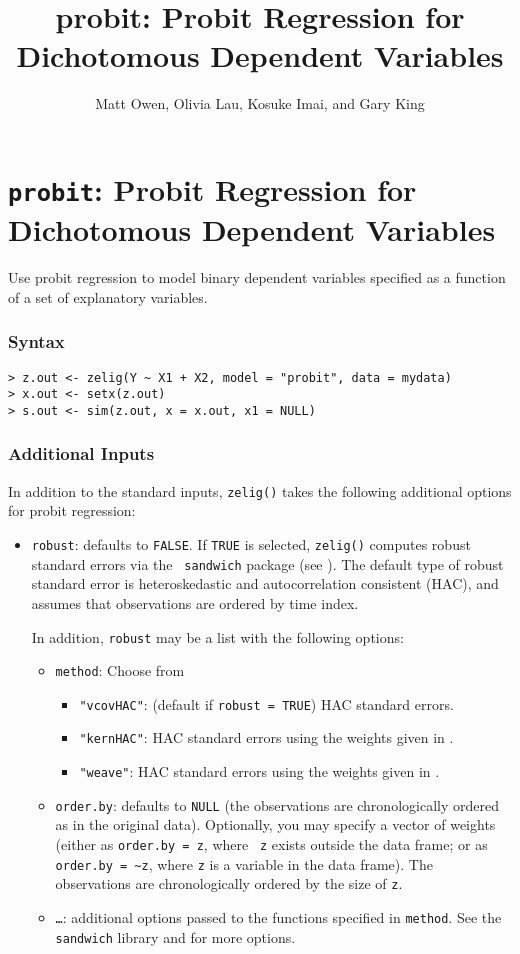 \documentclass{article}
\title{
  probit: Probit Regression for Dichotomous
  Dependent Variables
}
\author{Matt Owen, Olivia Lau, Kosuke Imai, and Gary King}
\begin{document}
\nobibliography*



\section{{\tt probit}: Probit Regression for Dichotomous Dependent Variables}\label{probit}

Use probit regression to model binary dependent variables
specified as a function of a set of explanatory variables.  

\subsubsection{Syntax}
\begin{verbatim}
> z.out <- zelig(Y ~ X1 + X2, model = "probit", data = mydata)
> x.out <- setx(z.out)
> s.out <- sim(z.out, x = x.out, x1 = NULL)
\end{verbatim}

\subsubsection{Additional Inputs} 

In addition to the standard inputs, {\tt zelig()} takes the following
additional options for probit regression:  
\begin{itemize}
\item {\tt robust}: defaults to {\tt FALSE}.  If {\tt TRUE} is
selected, {\tt zelig()} computes robust standard errors via the {\tt
sandwich} package (see \cite{Zeileis04}).  The default type of robust
standard error is heteroskedastic and autocorrelation consistent (HAC),
and assumes that observations are ordered by time index.

In addition, {\tt robust} may be a list with the following options:  
\begin{itemize}
\item {\tt method}:  Choose from 
\begin{itemize}
\item {\tt "vcovHAC"}: (default if {\tt robust = TRUE}) HAC standard
errors. 
\item {\tt "kernHAC"}: HAC standard errors using the
weights given in \cite{Andrews91}. 
\item {\tt "weave"}: HAC standard errors using the
weights given in \cite{LumHea99}.  
\end{itemize}  
\item {\tt order.by}: defaults to {\tt NULL} (the observations are
chronologically ordered as in the original data).  Optionally, you may
specify a vector of weights (either as {\tt order.by = z}, where {\tt
z} exists outside the data frame; or as {\tt order.by = \~{}z}, where
{\tt z} is a variable in the data frame).  The observations are
chronologically ordered by the size of {\tt z}.
\item {\tt \dots}:  additional options passed to the functions 
specified in {\tt method}.   See the {\tt sandwich} library and
\cite{Zeileis04} for more options.   
\end{itemize}
\end{itemize}
\end{document}
